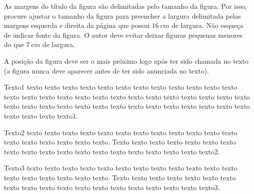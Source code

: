     As margens do título da figura são delimitadas pelo tamanho da figura. Por isso, procure ajustar o tamanho da figura para preencher a largura delimitada pelas margens esquerda e direita da página que possui $16~cm$ de largura. Não esqueça de indicar fonte da figura. O autor deve evitar deixar figuras pequenas menores do que $7~cm$ de largura.
    
    A posição da figura deve ser o mais próximo logo após ter sido chamada no texto (a figura nunca deve aparecer antes de ter sido anunciada no texto). 
    
 	\begin{figure}[h!] 
   	    \captionsetup{width=16cm}%
	\end{figure}
	
    Texto1 texto texto texto texto texto texto texto texto texto texto texto texto texto texto texto texto texto texto texto texto texto texto texto texto texto texto texto texto texto texto texto texto texto texto texto texto texto texto texto texto texto texto texto texto1.

    Texto2 texto texto texto texto texto texto texto texto texto texto texto texto texto texto texto texto texto texto. Texto texto texto texto texto texto texto texto texto texto texto texto texto texto texto texto texto texto texto2.

    Texto3 texto texto texto texto texto texto texto texto texto texto texto texto texto texto texto texto texto texto. Texto texto texto texto texto texto texto texto texto texto texto texto texto texto texto texto texto texto texto3.

